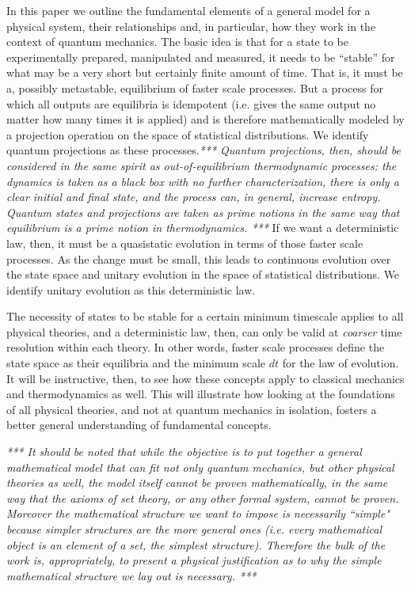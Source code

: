 \documentclass[applsci,article,submit,moreauthors,pdftex]{Definitions/mdpi}
\newcommand{\edit}[1] {\emph{*** #1 ***}}
\begin{document}
In this paper we outline the fundamental elements of a general model for a physical system, their relationships and, in particular, how they work in the context of quantum mechanics. The basic idea is that for a state to be experimentally prepared, manipulated and measured, it needs to be ``stable'' for what may be a very short but certainly finite amount of time. That is, it must be a, possibly metastable, equilibrium of faster scale processes. But a process for which all outputs are equilibria is idempotent (i.e. gives the same output no matter how many times it is applied) and is therefore mathematically modeled by a projection operation on the space of statistical distributions. We identify quantum projections as these processes.\edit{Quantum projections, then, should be considered in the same spirit as out-of-equilibrium thermodynamic processes: the dynamics is taken as a black box with no further characterization, there is only a clear initial and final state, and the process can, in general, increase entropy. Quantum states and projections are taken as prime notions in the same way that equilibrium is a prime notion in thermodynamics.} If we want a deterministic law, then, it must be a quasistatic evolution in terms of those faster scale processes. As the change must be small, this leads to continuous evolution over the state space and unitary evolution in the space of statistical distributions. We identify unitary evolution as this deterministic law.

The necessity of states to be stable for a certain minimum timescale applies to all physical theories, and a deterministic law, then, can only be valid at \emph{coarser} time resolution within each theory. In other words, faster scale processes define the state space as their equilibria and the minimum scale $dt$ for the law of evolution. It will be instructive, then, to see how these concepts apply to classical mechanics and thermodynamics as well. This will illustrate how looking at the foundations of all physical theories, and not at quantum mechanics in isolation, fosters a better general understanding of fundamental concepts.

\edit{It should be noted that while the objective is to put together a general mathematical model that can fit not only quantum mechanics, but other physical theories as well, the model itself cannot be proven mathematically, in the same way that the axioms of set theory, or any other formal system, cannot be proven. Moreover the mathematical structure we want to impose is necessarily ``simple" because simpler structures are the more general ones (i.e. every mathematical object is an element of a set, the simplest structure). Therefore the bulk of the work is, appropriately, to present a physical justification as to why the simple mathematical structure we lay out is necessary.}
\end{document}
